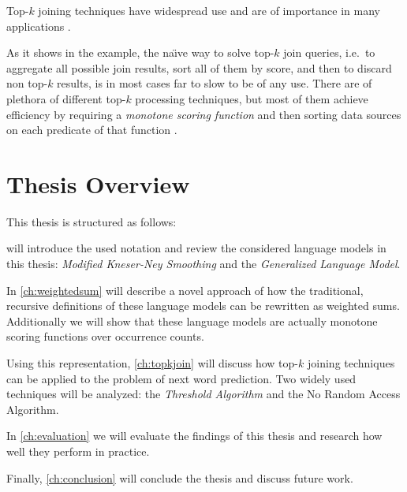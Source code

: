 \begin{draft}
Top-$k$ joining techniques have widespread use and are of importance in
many applications \noref.
\end{draft}

As it shows in the example, the na\"{\i}ve way to solve top-$k$ join
queries, i.e.\ to aggregate all possible join results, sort all of them by
score, and then to discard non top-$k$ results, is in most cases far to
slow to be of any use.
There are of plethora of different top-$k$ processing techniques, but most
of them achieve efficiency by requiring a \emph{monotone scoring function} and
then sorting data sources on each predicate of that function
\parencite{Ilyas2008}.


\section{Thesis Overview}

This thesis is structured as follows:

 will introduce the used notation and review the considered
language models in this thesis: \emph{Modified Kneser-Ney Smoothing} and the
\emph{Generalized Language Model}.

In \cref{ch:weightedsum} will describe a novel approach of how the traditional,
recursive definitions of these language models can be rewritten as weighted
sums.
Additionally we will show that these language models are actually monotone
scoring functions over occurrence counts.

Using this representation, \cref{ch:topkjoin} will discuss how top-$k$ joining
techniques can be applied to the problem of next word prediction.
Two widely used techniques will be analyzed: the \emph{Threshold Algorithm} and
the {No Random Access Algorithm}.

In \cref{ch:evaluation} we will evaluate the findings of this thesis and
research how well they perform in practice.

Finally, \cref{ch:conclusion} will conclude the thesis and discuss future work.
